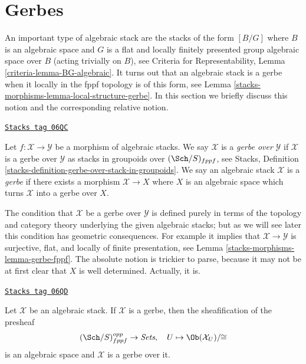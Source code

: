 \section{Gerbes}
\label{stacks-morphisms-section-gerbes}
An important type of algebraic stack are the stacks of the
form $[B/G]$ where $B$ is an algebraic space and $G$ is a flat
and locally finitely presented group algebraic space over $B$
(acting trivially on $B$), see
Criteria for Representability, Lemma \ref{criteria-lemma-BG-algebraic}.
It turns out that an algebraic stack is a gerbe when it locally in the
fppf topology is of this form, see
Lemma \ref{stacks-morphisms-lemma-local-structure-gerbe}.
In this section we briefly discuss this notion and the corresponding
relative notion.

\begin{definition}[Gerbe]
\label{stacks-morphisms-definition-gerbe}
\href{https://stacks.math.columbia.edu/tag/06QC}{\texttt{Stacks tag 06QC}}

Let $f : \mathcal{X} \to \mathcal{Y}$ be a morphism of algebraic stacks.
We say $\mathcal{X}$ is a {\it gerbe over} $\mathcal{Y}$ if
$\mathcal{X}$ is a gerbe over $\mathcal{Y}$ as stacks
in groupoids over $(\Sch/S)_{fppf}$, see
Stacks, Definition \ref{stacks-definition-gerbe-over-stack-in-groupoids}.
We say an algebraic stack $\mathcal{X}$ is a {\it gerbe} if there exists
a morphism $\mathcal{X} \to X$ where $X$ is an algebraic space which
turns $\mathcal{X}$ into a gerbe over $X$.
\end{definition}

The condition that $\mathcal{X}$ be a gerbe over $\mathcal{Y}$ is defined
purely in terms of the topology and category theory underlying the given
algebraic stacks; but as we will see later this condition has
geometric consequences. For example it implies that
$\mathcal{X} \to \mathcal{Y}$ is surjective, flat, and
locally of finite presentation, see
Lemma \ref{stacks-morphisms-lemma-gerbe-fppf}.
The absolute notion is trickier to parse, because it
may not be at first clear that $X$ is well determined. Actually, it is.

\begin{lemma}
\label{stacks-morphisms-lemma-gerbe-over-iso-classes}
\href{https://stacks.math.columbia.edu/tag/06QD}{\texttt{Stacks tag 06QD}}

Let $\mathcal{X}$ be an algebraic stack. If $\mathcal{X}$ is a gerbe, then
the sheafification of the presheaf
$$
(\Sch/S)_{fppf}^{opp} \to \textit{Sets}, \quad
U \mapsto \Ob(\mathcal{X}_U)/\!\!\cong
$$
is an algebraic space and $\mathcal{X}$ is a gerbe over it.
\end{lemma}

